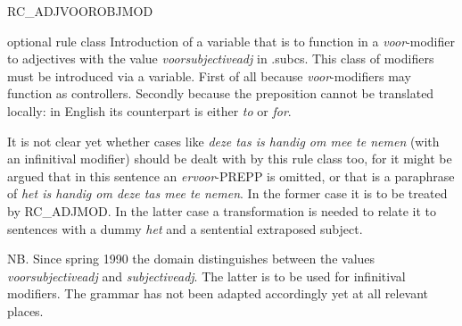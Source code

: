 \begin{mruleclass}{RC\_ADJVOOROBJMOD}
\begin{classdescr}
\kind optional rule class
\classtask Introduction of a variable that is to 
function in a {\em voor}-modifier to adjectives with the value 
{\em voorsubjectiveadj} in .subcs. This class of modifiers must be introduced 
via 
a variable. First of all 
because {\em voor}-modifiers may function as controllers. Secondly
because the preposition cannot be translated locally: in English 
its counterpart is either {\em to} or {\em for}. 
\nofilters

\nospeedrules

\noplannedrules

\norulesnotince
\classremarks
It is not clear yet whether cases like {\em deze tas is handig om mee te 
nemen} (with an infinitival modifier) 
should be dealt with by this rule class too, for it might be argued that
in this sentence an {\em ervoor}-PREPP is omitted, or that is a paraphrase of 
{\em het is handig om deze tas mee te nemen}. In the former case it is to 
be treated by RC\_ADJMOD. In the latter case a transformation is needed to 
relate it to sentences with a dummy  {\em het} and a sentential 
extraposed subject.

NB. Since spring 1990 the domain distinguishes between the values {\em 
voorsubjectiveadj} and {\em subjectiveadj}. The latter is to be used for 
infinitival  modifiers. 
The grammar has not been adapted accordingly yet at all relevant places. 


\end{classdescr}


\end{mruleclass}
